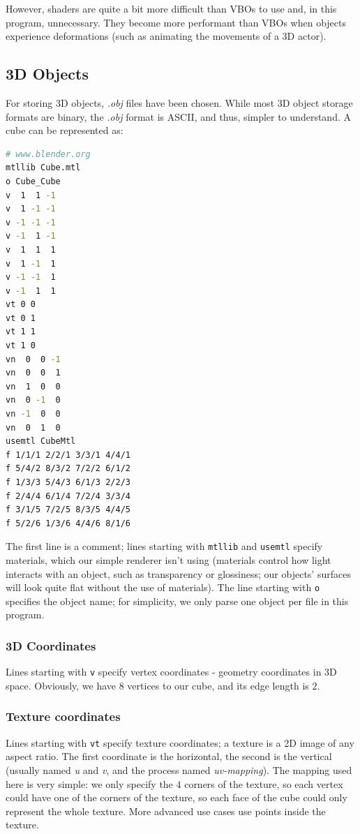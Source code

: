 \documentclass{scrartcl}
\begin{document}
However, shaders are quite a bit more difficult than VBOs to use and, in this program, unnecessary. They become more performant than VBOs when objects experience deformations (such as animating the movements of a 3D actor).

\subsection{3D Objects}
For storing 3D objects, \textit{.obj} files have been chosen. While most 3D object storage formats are binary, the \textit{.obj} format is ASCII, and thus, simpler to understand. A cube can be represented as:

\begin{lstlisting}[language=sh]
# www.blender.org
mtllib Cube.mtl
o Cube_Cube
v  1  1 -1
v  1 -1 -1
v -1 -1 -1
v -1  1 -1
v  1  1  1
v  1 -1  1
v -1 -1  1
v -1  1  1
vt 0 0
vt 0 1
vt 1 1
vt 1 0
vn  0  0 -1
vn  0  0  1
vn  1  0  0
vn  0 -1  0
vn -1  0  0
vn  0  1  0
usemtl CubeMtl
f 1/1/1 2/2/1 3/3/1 4/4/1 
f 5/4/2 8/3/2 7/2/2 6/1/2 
f 1/3/3 5/4/3 6/1/3 2/2/3 
f 2/4/4 6/1/4 7/2/4 3/3/4 
f 3/1/5 7/2/5 8/3/5 4/4/5 
f 5/2/6 1/3/6 4/4/6 8/1/6 
\end{lstlisting}

The first line is a comment; lines starting with \lstinline{mtllib} and \lstinline{usemtl} specify materials, which our simple renderer isn't using (materials control how light interacts with an object, such as transparency or glossiness; our objects' surfaces will look quite flat without the use of materials). The line starting with \lstinline{o} specifies the object name; for simplicity, we only parse one object per file in this program.

\subsubsection{3D Coordinates}

Lines starting with \lstinline{v} specify vertex coordinates - geometry coordinates in 3D space. Obviously, we have 8 vertices to our cube, and its edge length is $2$.

\subsubsection{Texture coordinates}

Lines starting with \lstinline{vt} specify texture coordinates; a texture is a 2D image of any aspect ratio. The first coordinate is the horizontal, the second is the vertical (usually named \textit{u} and \textit{v}, and the process named \textit{uv-mapping}). The mapping used here is very simple: we only specify the $4$ corners of the texture, so each vertex could have one of the corners of the texture, so each face of the cube could only represent the whole texture. More advanced use cases use points inside the texture.
\end{document}
